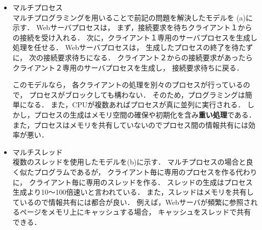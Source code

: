\begin{itemize}
\item マルチプロセス \\
マルチプログラミングを用いることで前記の問題を解決したモデルを
(a)に示す．
Webサーバプロセスは，
まず，接続要求を待ちクライアント１からの接続を受け入れる．
次に，クライアント１専用のサーバプロセスを生成し処理を任せる．
Webサーバプロセスは，
生成したプロセスの終了を待たずに，
次の接続要求待ちになる．
クライアント２からの接続要求があったら
クライアント２専用のサーバプロセスを生成し，
接続要求待ちに戻る．

このモデルなら，
各クライアントの処理を別々のプロセスが行っているので，
プロセスがブロックしても構わない．
そのため，プログラミングは簡単になる．
また，CPUが複数あればプロセスが真に並列に実行される．
しかし，プロセスの生成はメモリ空間の確保や初期化を含み{\bf 重い処理}である．
また，プロセスはメモリを共有していないのでプロセス間の情報共有には効率が悪い．

\item マルチスレッド \\
複数のスレッドを使用したモデルを(b)に示す．
マルチプロセスの場合と良く似たプログラムであるが，
クライアント毎に専用のプロセスを作る代わりに，
クライアント毎に専用のスレッドを作る．
スレッドの生成はプロセス生成より10〜100倍速いと言われている\cite{lightWeight}．
また，スレッドはメモリを共有しているので情報共有には都合が良い．
例えば，Webサーバが頻繁に参照されるページをメモリ上にキャッシュする場合，
キャッシュをスレッドで共有できる．
\end{itemize}


